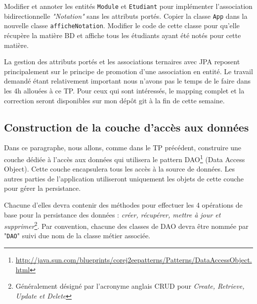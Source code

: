 \documentclass[a4paper,11pt]{article}
\begin{document}
\Question Modifier et annoter les entités \texttt{Module} et \texttt{Etudiant} pour implémenter l'association 
bidirectionnelle \textit{"Notation"} sans les attributs portés.
\Question Copier la classe \texttt{App} dans la nouvelle classe \texttt{afficheNotation}. Modifier le code de cette classe 
pour qu'elle récupère la matière BD et affiche tous les étudiants ayant été notés pour cette matière.

La gestion des attributs portés et les associations ternaires avec JPA reposent principalement sur le principe de 
promotion d'une association en entité. Le travail demandé étant relativement important nous n'avons pas le temps de le 
faire dans les 4h allouées à ce TP. Pour ceux qui sont intéressés, le mapping complet et la correction seront disponibles 
sur mon dépôt git à la fin de cette semaine.  

\subsection{Construction de la couche d'accès aux données}
Dans ce paragraphe, nous allons, comme dans le TP précédent, construire une couche dédiée à l'accès aux données 
qui utilisera le pattern DAO\footnote{\url{http://java.sun.com/blueprints/corej2eepatterns/Patterns/DataAccessObject.html}} (Data Access Object).
Cette couche encapsulera tous les accès à la source de données. Les autres parties de l'application 
utiliseront uniquement les objets de cette couche pour gérer la persistance. 

Chacune d'elles devra contenir des méthodes pour effectuer les 4 opérations de base pour la persistance des données : 
\textit{créer, récupérer, mettre à jour et supprimer}\footnote{Généralement désigné par l'acronyme anglais CRUD pour 
\textit{Create, Retrieve, Update et Delete}}. Par convention, chacune des classes de DAO devra être 
nommée par "\texttt{DAO}" suivi due nom de la classe métier associée. 
\end{document}
